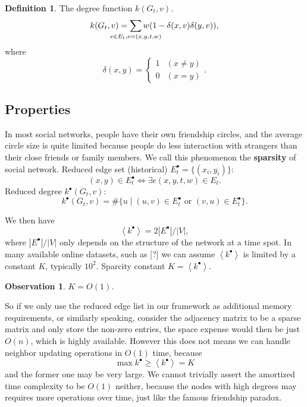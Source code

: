 \documentclass[12pt,abstract=true]{scrartcl}
\numberwithin{equation}{section}
\theoremstyle{definition}   \newtheorem{definition}{Definition}[section]
\theoremstyle{plain}        \newtheorem{theorem}{Theorem}[section]
\theoremstyle{plain}        \newtheorem{observation}{Observation}[section]
\theoremstyle{plain}        \newtheorem{fact}{Fact}[section]
\theoremstyle{plain}        \newtheorem{claim}{Claim}[section]
\theoremstyle{plain}        \newtheorem{lemma}[theorem]{Lemma}
\theoremstyle{plain}        \newtheorem{corollary}[theorem]{Corollary}
\theoremstyle{remark}       \newtheorem{example}{Example}[section]
\theoremstyle{remark}       \newtheorem{remark}{Remark}[section]
\begin{document}
\begin{definition}
The degree function $k(G_t,v)$.
\begin{equation}
k(G_t,v)=\sum_{\mathclap{e\in E_t, e=(x,y,t,w)}}w(1-\delta(x,v)\delta(y,v)),
\end{equation}
where \begin{equation}
\delta(x,y)=\begin{cases}1&(x\neq y)\\0&(x=y)\end{cases}.
\end{equation}
\end{definition}

\subsection{Properties}
In most social networks, people have their own friendship circles, and the
average circle size is quite limited because people do less interaction with
strangers than their close friends or family members. We call this phenomenon
the \textbf{sparsity} of social network.
 Reduced edge set (historical) $E_t^\bullet=\{(x_i,y_i)\}$:
\begin{equation}
(x,y)\in E_t^\bullet \iff \exists e(x,y,t,w)\in E_t.
\end{equation}
 Reduced degree $k^\bullet(G_t,v)$:
\begin{equation}
k^\bullet(G_t,v)=\#\{u\;|\;(u,v)\in E_t^\bullet\text{ or }(v,u)\in
E_t^\bullet\}.
\end{equation}

We then have
\begin{equation}
\left<k^\bullet\right>=2\left|E^\bullet\right|/\left|V\right|,
\end{equation}
where $\left|E^\bullet\right|/\left|V\right|$ only depends on the structure of
the network at a time spot. In many available online datasets, such as [?]%
we can assume $\left<k^\bullet\right>$ is limited by a constant $K$, typically
$10^2$.
 Sparcity constant $K=\left<k^\bullet\right>$.

\begin{observation} $K=O(1)$.
\end{observation}
So if we only use the reduced edge list in our framework as additional memory
requirements, or similarly speaking, consider the adjacency matrix to be a
sparse matrix and only store the non-zero entries, the space expense would then
be just $O(n)$, which is highly available. However this does not means we can
handle neighbor updating operations in $O(1)$ time, because
\begin{equation}\max k^\bullet\geq
\left<k^\bullet\right>=K \end{equation} and the former one may be very large.
We cannot trivially assert the amortized time complexity to be $O(1)$ neither,
because the nodes with high degrees may requires more operations over time,
just like the famous friendship paradox\cite{feld1991your}.
\end{document}
